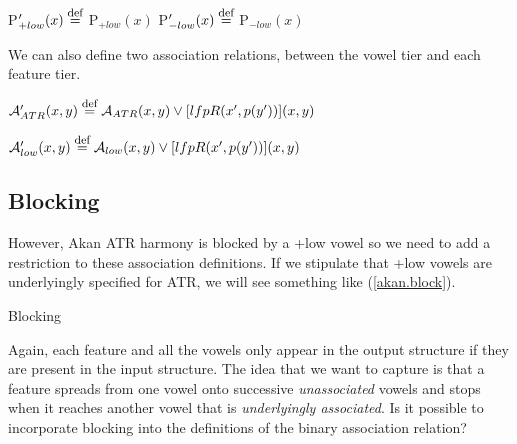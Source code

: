 \documentclass[,doc,floatsintext]{apa6}
\def\defeq{\mathrel{\buildrel \mbox{\footnotesize def} \over =}}
\theoremstyle{definition}
\theoremstyle{definition}
\theoremstyle{definition}
\theoremstyle{remark}
\begin{document}
P\('_{+low}(x) \defeq\) P\(_{+low}(x)\) \hspace{2.25in}
P\('_{-low}(x) \defeq\) P\(_{-low}(x)\)

\noindent We can also define two association relations, between the
vowel tier and each feature tier.

\(\mathcal{A}_{ATR}'(x, y) \defeq \mathcal{A}_{ATR}(x, y)\vee [lfp R(x', p(y'))](x, y)\)

\(\mathcal{A}_{low}'(x, y) \defeq \mathcal{A}_{low}(x, y)\vee [lfp R(x', p(y'))](x, y)\)

\subsection{Blocking}\label{blocking}

However, Akan ATR harmony is blocked by a +low vowel so we need to add a
restriction to these association definitions. If we stipulate that +low
vowels are underlyingly specified for ATR, we will see something like
(\ref{akan.block}).

\begin{exe}
  \ex \label{akan.block} Blocking\\
\end{exe}

\noindent Again, each feature and all the vowels only appear in the
output structure if they are present in the input structure. The idea
that we want to capture is that a feature spreads from one vowel onto
successive \emph{unassociated} vowels and stops when it reaches another
vowel that is \emph{underlyingly associated}. Is it possible to
incorporate blocking into the definitions of the binary association
relation?
\end{document}
